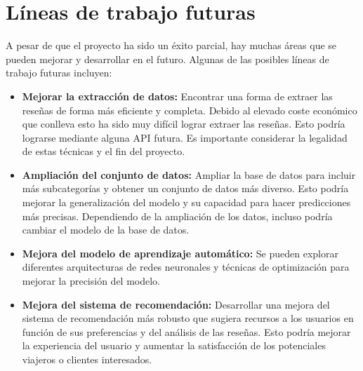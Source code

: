\section{Líneas de trabajo futuras}

A pesar de que el proyecto ha sido un éxito parcial, hay muchas áreas que se pueden mejorar y desarrollar en el futuro. Algunas de las posibles líneas de trabajo futuras incluyen:

\begin{itemize}
    \item \textbf{Mejorar la extracción de datos:} Encontrar una forma de extraer las reseñas de forma más eficiente y completa. Debido al elevado coste económico que conlleva esto ha sido muy difícil lograr extraer las reseñas. Esto podría lograrse mediante alguna API futura. Es importante considerar la legalidad de estas técnicas y el fin del proyecto.
    \item \textbf{Ampliación del conjunto de datos:} Ampliar la base de datos para incluir más subcategorías y obtener un conjunto de datos más diverso. Esto podría mejorar la generalización del modelo y su capacidad para hacer predicciones más precisas. Dependiendo de la ampliación de los datos, incluso podría cambiar el modelo de la base de datos.
    \item \textbf{Mejora del modelo de aprendizaje automático:} Se pueden explorar diferentes arquitecturas de redes neuronales y técnicas de optimización para mejorar la precisión del modelo.
    \item \textbf{Mejora del sistema de recomendación:} Desarrollar una mejora del sistema de recomendación más robusto que sugiera recursos a los usuarios en función de sus preferencias y del análisis de las reseñas. Esto podría mejorar la experiencia del usuario y aumentar la satisfacción de los potenciales viajeros o clientes interesados.
\end{itemize}